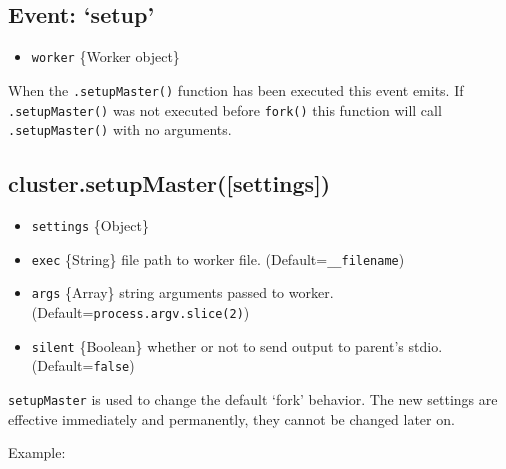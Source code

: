 \subsection{Event: `setup'}

\begin{itemize}
\item
  \texttt{worker} \{Worker object\}
\end{itemize}

When the \texttt{.setupMaster()} function has been executed this event
emits. If \texttt{.setupMaster()} was not executed before
\texttt{fork()} this function will call \texttt{.setupMaster()} with no
arguments.

\subsection{cluster.setupMaster({[}settings{]})}

\begin{itemize}
\item
  \texttt{settings} \{Object\}
\item
  \texttt{exec} \{String\} file path to worker file.
  (Default=\texttt{\_\_filename})
\item
  \texttt{args} \{Array\} string arguments passed to worker.
  (Default=\texttt{process.argv.slice(2)})
\item
  \texttt{silent} \{Boolean\} whether or not to send output to parent's
  stdio. (Default=\texttt{false})
\end{itemize}

\texttt{setupMaster} is used to change the default `fork' behavior. The
new settings are effective immediately and permanently, they cannot be
changed later on.

Example:

\begin{Shaded}
\begin{Highlighting}[]
 \NormalTok{);}
\NormalTok{(\{}
  \NormalTok{: }\NormalTok{,}
  \NormalTok{: [}\NormalTok{, }\NormalTok{],}
  \NormalTok{: }
\NormalTok{\});}
\NormalTok{();}
\end{Highlighting}
\end{Shaded}


